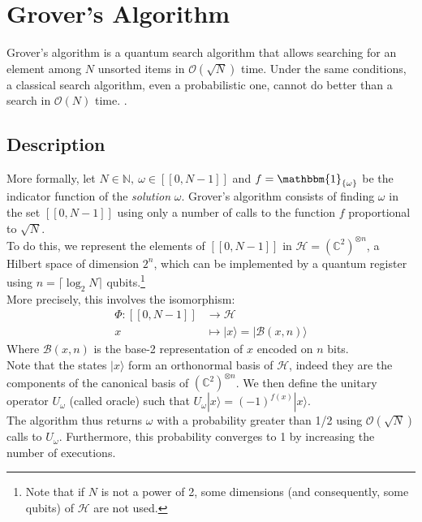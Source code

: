 \section{Grover's Algorithm}
\label{part1}

Grover's algorithm is a quantum search algorithm that allows searching for an element among $N$ unsorted items in $\mathcal{O}(\sqrt{N})$ time.
Under the same conditions, a classical search algorithm, even a probabilistic one, cannot do better than a search in $\mathcal{O}(N)$ time. \cite{grover1996fast}.
 

\subsection{Description}

More formally, let $N \in \mathbb{N}, \ \omega \in [\![0, N-1]\!]$ and $f = \mathbbm{1}_{\{ \omega \}}$ be the indicator function of the \textit{solution} $\omega$.
Grover's algorithm consists of finding $\omega$ in the set $[\![0, N-1]\!]$ using only a number of calls to the function $f$ proportional to $\sqrt{N}$. 
\\
To do this, we represent the elements of $[\![0, N-1]\!]$ in $\mathcal{H} = (\mathbb{C}^2)^{\otimes n}$, a Hilbert space of dimension $2^n$, which can be implemented by a quantum register using $n=\lceil{\log_{2} N} \rceil$ qubits.\footnote{Note that if $N$ is not a power of 2, some dimensions (and consequently, some qubits) of $\mathcal{H}$ are not used. }
\\
More precisely, this involves the isomorphism:
\begin{align*}
	\Phi : [\![0, N-1]\!] &\longrightarrow \mathcal{H} \\
	x &\longmapsto | x \rangle = | \mathscr{B}(x, n)\rangle
\end{align*}
Where $\mathscr{B}(x, n)$ is the base-2 representation of $x$ encoded on $n$ bits.\footnotemark
{}
\\
Note that the states $| x \rangle$ form an orthonormal basis of $\mathcal{H}$, indeed they are the components of the canonical basis of $(\mathbb{C}^2)^{\otimes n}$.
We then define the unitary operator $U_{\omega}$ (called oracle) such that $U_{\omega}|x\rangle = (-1)^{f(x)}|x\rangle$. 
\\
The algorithm thus returns $\omega$ with a probability greater than 1/2 using $\mathcal{O}(\sqrt{N})$ calls to $U_{\omega}$. Furthermore, this probability converges to 1 by increasing the number of executions.

